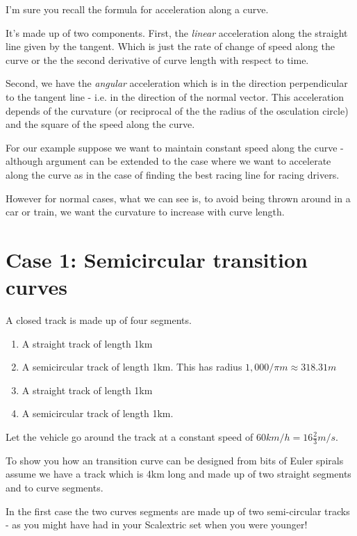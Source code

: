 \documentclass[]{article} %
\theoremstyle{definition}
\theoremstyle{theorem}
\begin{document}
I'm sure you recall the formula for acceleration along a curve. 

It's made up of two components. First, the \emph{linear} acceleration along the straight line given by the tangent. Which is just the rate of change of speed along the curve or the the second derivative of curve length with respect to time.

Second, we have the \emph{angular} acceleration which is in the direction perpendicular to the tangent line - i.e. in the direction of the normal vector. This acceleration depends of the curvature (or reciprocal of the the radius of the osculation circle) and the square of the speed along the curve.

For our example suppose we want to maintain constant speed along the curve - although argument can be extended to the case where we want to accelerate along the curve as in the case of finding the best racing line for racing drivers.

However for normal cases, what we can see is, to avoid being thrown around in a car or train, we want the curvature to increase with curve length.

\section{Case 1: Semicircular transition curves}
\begin{tcolorbox}
	A closed  track is made up of four segments.
	\begin{enumerate}
		\item A straight track of length 1km
		\item A semicircular track of length 1km. This has radius $1,000 / \pi m \approx 318.31m$
		\item A straight track of length 1km
		\item A semicircular track of length 1km.
	\end{enumerate}
	Let the vehicle go around the track at a constant speed of $60 km/h = 16 \frac{2}{3} m/s$.
\end{tcolorbox}

To show you how an transition curve can be designed from bits of Euler spirals assume we have a track which is 4km long and made up of two straight segments and to curve segments. 

In the first case the two curves segments are made up of two semi-circular tracks - as you might have had in your Scalextric set when you were younger!
\end{document}
